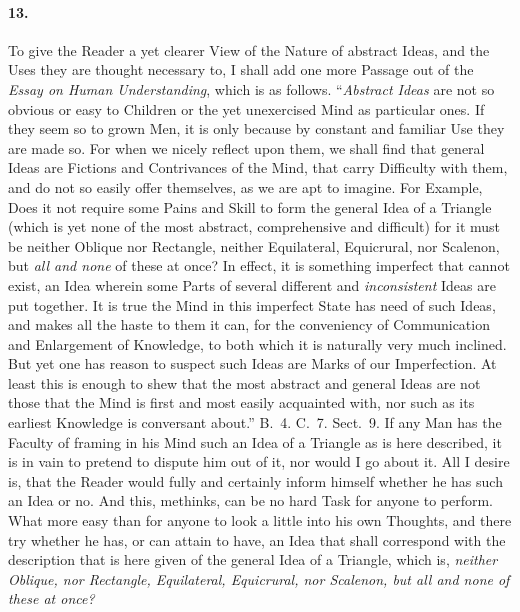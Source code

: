\documentclass[]{article}
\newenvironment{sectionbody}{\begin{multicols}{2}}{\end{multicols}}
\begin{document}
\begin{sectionbody}
\paragraph{13.} To give the Reader a yet clearer View of the Nature of abstract
Ideas, and the Uses they are thought necessary to, I shall add
one more Passage out of the \emph{Essay on Human
Understanding}, which is as follows.  ``\emph{Abstract
Ideas} are not so obvious or easy to Children or the yet
unexercised Mind as particular ones.  If they seem so to grown
Men, it is only because by constant and familiar Use they are
made so.  For when we nicely reflect upon them, we shall find
that general Ideas are Fictions and Contrivances of the Mind,
that carry Difficulty with them, and do not so easily offer
themselves, as we are apt to imagine.  For Example, Does it not
require some Pains and Skill to form the general Idea of a
Triangle (which is yet none of the most abstract, comprehensive
and difficult) for it must be neither Oblique nor Rectangle,
neither Equilateral, Equicrural, nor Scalenon, but \emph{all and
none} of these at once?  In effect, it is something imperfect
that cannot exist, an Idea wherein some Parts of several
different and \emph{inconsistent} Ideas are put together.  It
is true the Mind in this imperfect State has need of such Ideas,
and makes all the haste to them it can, for the conveniency of
Communication and Enlargement of Knowledge, to both which it is
naturally very much inclined.  But yet one has reason to suspect
such Ideas are Marks of our Imperfection.  At least this is
enough to shew that the most abstract and general Ideas are not
those that the Mind is first and most easily acquainted with, nor
such as its earliest Knowledge is conversant about.''
B.~4. C.~7. Sect.~9.
If any Man has the Faculty of framing in his Mind such an Idea of
a Triangle as is here described, it is in vain to pretend to
dispute him out of it, nor would I go about it.  All I desire is,
that the Reader would fully and certainly inform himself whether
he has such an Idea or no.  And this, methinks, can be no hard
Task for anyone to perform.  What more easy than for anyone to
look a little into his own Thoughts, and there try whether he
has, or can attain to have, an Idea that shall correspond with
the description that is here given of the general Idea of a
Triangle, which is, \emph{neither Oblique, nor Rectangle,
Equilateral, Equicrural, nor Scalenon, but all and none of these
at once?}




\end{sectionbody}
\end{document}
